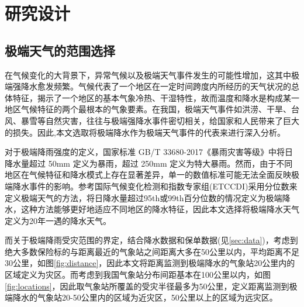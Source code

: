 \chapter{研究设计}\label{chap:3}
\section{极端天气的范围选择}\label{sec:def}

在气候变化的大背景下，异常气候以及极端天气事件发生的可能性增加\citep{aigner2023summary,donat2017addendum}，这其中极端强降水愈发频繁\citep{trenberth2010relationships}。气候代表了一个地区在一定时间跨度内所经历的天气状况的总体特征，揭示了一个地区的基本气象冷热、干湿特性，故而温度和降水是构成某一地区气候特征的两个最根本的气象要素\citep{alexander2006global}。在我国，极端天气事件如洪涝、干旱、台风、暴雪等自然灾害\citep{尹红2019基于}，往往与极端强降水事件密切相关，给国家和人民带来了巨大的损失。因此,本文选取将极端降水作为极端天气事件的代表来进行深入分析。

对于极端降雨强度的定义，国家标准 GB/T 33680-2017《暴雨灾害等级》中将日降水量超过 50mm 定义为暴雨，超过 250mm 定义为特大暴雨。然而，由于不同地区在气候特征和降水模式上存在显著差异，单一的数值标准可能无法全面反映极端降水事件的影响。参考国际气候变化检测和指数专家组(ETCCDI)采用分位数来定义极端天气的方法，将日降水量超过95th或99th百分位数的情况定义为极端降水，这种方法能够更好地适应不同地区的降水特征，因此本文选择将极端降水天气定义为20年一遇的降水天气。

而关于极端降雨受灾范围的界定，结合降水数据和保单数据(见\ref{sec:data})，考虑到绝大多数保险标的与距离最近的气象站之间距离大多在50公里以内，平均距离不足30公里，如图\ref{fig:distance}，因此本文将距离监测到极端降水的气象站20公里内的区域定义为灾区。而考虑到我国气象站分布间距基本在100公里以内，如图\ref{fig:locations}，因此取气象站所覆盖的受灾半径最多为50公里，定义距离监测到极端降水的气象站20-50公里内的区域为近灾区，50公里以上的区域为远灾区。

